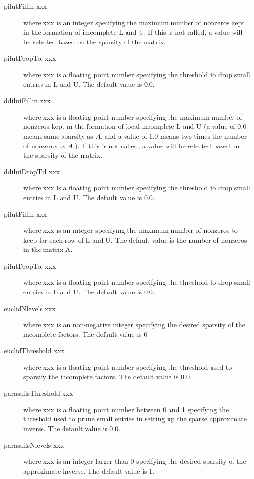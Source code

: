 \begin{description}
\item[pilutFillin xxx] where xxx is an integer specifying the maximum
           number of nonzeros kept in the formation of imcomplete L
           and U.  If this is not called, a value will be selected
           based on the sparsity of the matrix.
\item[pilutDropTol xxx] where xxx is a floating point number specifying the 
           threshold to drop small entries in L and U.  The default
           value is 0.0.
\item[ddilutFillin xxx] where xxx is a floating point number specifying 
           the maximum number of nonzeros kept in the formation of local 
           incomplete L and U (a value of $0.0$ means same sparsity as $A$,
           and a value of $1.0$ means two times the number of nonzeros as
           $A$.).  If this is not called, a value will be selected
           based on the sparsity of the matrix.
\item[ddilutDropTol xxx] where xxx is a floating point number specifying the 
           threshold to drop small entries in L and U.  The default
           value is 0.0.
\item[pilutFillin xxx] where xxx is an integer specifying the 
           maximum number of nonzeros to keep for each row of L and U.
           The default value is the number of nonzeros in the matrix A.
\item[pilutDropTol xxx] where xxx is a floating point number specifying the 
           threshold to drop small entries in L and U.  The default
           value is 0.0.
\item[euclidNlevels xxx] where xxx is an non-negative integer specifying 
           the desired sparsity of the incomplete factors.  The
           default value is 0.
\item[euclidThreshold xxx] where xxx is a floating point number specifying 
           the threshold used to sparsify the incomplete factors.  The default
           value is 0.0.
\item[parasailsThreshold xxx] where xxx is a floating point number between 0 
           and 1 specifying the threshold used to prune small entries
           in setting up the sparse approximate inverse.  The default
           value is 0.0.
\item[parasailsNlevels xxx] where xxx is an integer larger than 0 specifying 
           the desired sparsity of the approximate inverse.  The
           default value is 1.

\end{description}
